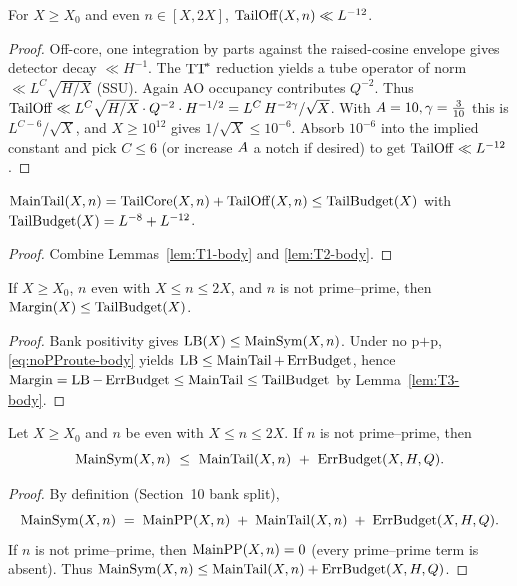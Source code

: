 \begin{lemma}\label{lem:T2-body}
For \(X\ge X_0\) and even \(n\in[X,2X]\), \(\mathrm{TailOff}(X,n)\ll L^{-12}\).
\end{lemma}

\begin{proof}
Off-core, one integration by parts against the raised-cosine envelope gives detector decay \(\ll H^{-1}\).
The \(\textup{TT}^{\!*}\) reduction yields a tube operator of norm \(\ll L^C\sqrt{H/X}\) (SSU).
Again AO occupancy contributes \(Q^{-2}\).
Thus \(\mathrm{TailOff}\ll L^{C}\sqrt{H/X}\cdot Q^{-2}\cdot H^{-1/2}=L^{C}\,H^{-2\gamma}/\sqrt{X}\).
With \(A=10,\gamma=\tfrac{3}{10}\) this is \(L^{C-6}/\sqrt{X}\), and \(X\ge 10^{12}\) gives \(1/\sqrt{X}\le 10^{-6}\).
Absorb \(10^{-6}\) into the implied constant and pick \(C\le 6\) (or increase \(A\) a notch if desired) to get \(\mathrm{TailOff}\ll L^{-12}\).
\end{proof}

\begin{lemma}[T3: consolidation]\label{lem:T3-body}
\(\operatorname{MainTail}(X,n)=\mathrm{TailCore}(X,n)+\mathrm{TailOff}(X,n)\le \operatorname{TailBudget}(X)\) with \(\operatorname{TailBudget}(X)=L^{-8}+L^{-12}\).
\end{lemma}

\begin{proof}
Combine Lemmas~\ref{lem:T1-body} and \ref{lem:T2-body}.
\end{proof}

\begin{theorem}\label{thm:tailMarginBridge-body}
If \(X\ge X_0\), \(n\) even with \(X\le n\le 2X\), and \(n\) is not prime–prime, then
\(\operatorname{Margin}(X)\le \operatorname{TailBudget}(X)\).
\end{theorem}

\begin{proof}
Bank positivity gives \(\operatorname{LB}(X)\le \operatorname{MainSym}(X,n)\).
Under no p\(+\)p, \eqref{eq:noPProute-body} yields \(\operatorname{LB}\le \operatorname{MainTail}+\operatorname{ErrBudget}\), hence
\(\operatorname{Margin}=\operatorname{LB}-\operatorname{ErrBudget}\le \operatorname{MainTail}\le \operatorname{TailBudget}\) by Lemma~\ref{lem:T3-body}.
\end{proof}

\begin{lemma}[No $p{+}p$ routing]\label{lem:X.noPProuting}
Let $X\ge X_0$ and $n$ be even with $X\le n\le 2X$.
If $n$ is not prime–prime, then
\[
  \MainSym(X,n)\ \le\ \MainTail(X,n)\ +\ \ErrBudget(X,H,Q).
\]
\end{lemma}

\begin{proof}
By definition (Section~10 bank split),
\[
  \operatorname{MainSym}(X,n)\;=\;\operatorname{MainPP}(X,n)\;+\;\operatorname{MainTail}(X,n)\;+\;\operatorname{ErrBudget}(X,H,Q).
\]
If $n$ is not prime–prime, then $\operatorname{MainPP}(X,n)=0$ (every prime–prime term is absent).
Thus $\operatorname{MainSym}(X,n)\le \operatorname{MainTail}(X,n)+\operatorname{ErrBudget}(X,H,Q)$.
\end{proof}

